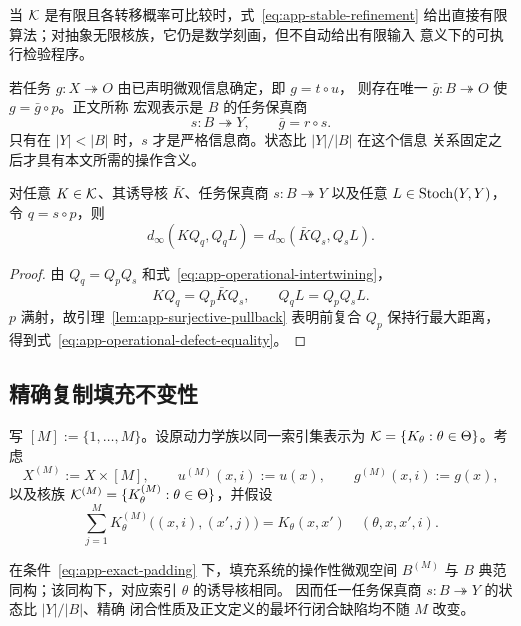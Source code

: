 当 $\mathcal K$ 是有限且各转移概率可比较时，式~\eqref{eq:app-stable-refinement}
给出直接有限算法；对抽象无限核族，它仍是数学刻画，但不自动给出有限输入
意义下的可执行检验程序。

若任务 $g:X\twoheadrightarrow O$ 由已声明微观信息确定，即 $g=t\circ u$，
则存在唯一 $\bar g:B\twoheadrightarrow O$ 使 $g=\bar g\circ p$。正文所称
宏观表示是 $B$ 的任务保真商
\[
  s:B\twoheadrightarrow Y,
  \qquad \bar g=r\circ s.
\]
只有在 $|Y|<|B|$ 时，$s$ 才是严格信息商。状态比 $|Y|/|B|$ 在这个信息
关系固定之后才具有本文所需的操作含义。

\begin{proposition}[约化前后闭合缺陷相同]
\label{prop:app-operational-defect-equality}
对任意 $K\in\mathcal K$、其诱导核 $\bar K$、任务保真商
$s:B\twoheadrightarrow Y$ 以及任意 $L\in\operatorname{Stoch}(Y,Y)$，令
$q=s\circ p$，则
\begin{equation}
 d_\infty(KQ_q,Q_qL)
 =
 d_\infty(\bar KQ_s,Q_sL).
 \label{eq:app-operational-defect-equality}
\end{equation}
\end{proposition}

\begin{proof}
由 $Q_q=Q_pQ_s$ 和式~\eqref{eq:app-operational-intertwining}，
\[
 KQ_q=Q_p\bar KQ_s,
 \qquad
 Q_qL=Q_pQ_sL.
\]
$p$ 满射，故引理~\ref{lem:app-surjective-pullback} 表明前复合 $Q_p$
保持行最大距离，得到式~\eqref{eq:app-operational-defect-equality}。
\end{proof}

\subsection{精确复制填充不变性}

写 $[M]:=\{1,\ldots,M\}$。设原动力学族以同一索引集表示为
$\mathcal K=\{K_\theta:\theta\in\Theta\}$。考虑
\[
 X^{(M)}:=X\times[M],
 \qquad
 u^{(M)}(x,i):=u(x),
 \qquad
 g^{(M)}(x,i):=g(x),
\]
以及核族 $\mathcal K^{(M)}=\{K_\theta^{(M)}:\theta\in\Theta\}$，并假设
\begin{equation}
 \sum_{j=1}^M
 K_\theta^{(M)}\bigl((x,i),(x',j)\bigr)
 =K_\theta(x,x')
 \quad
 (\theta,x,x',i).
 \label{eq:app-exact-padding}
\end{equation}

\begin{theorem}[无意义复制填充不变性]
\label{thm:app-padding-invariance}
在条件~\eqref{eq:app-exact-padding} 下，填充系统的操作性微观空间
$B^{(M)}$ 与 $B$ 典范同构；该同构下，对应索引 $\theta$ 的诱导核相同。
因而任一任务保真商 $s:B\twoheadrightarrow Y$ 的状态比 $|Y|/|B|$、精确
闭合性质及正文定义的最坏行闭合缺陷均不随 $M$ 改变。
\end{theorem}

